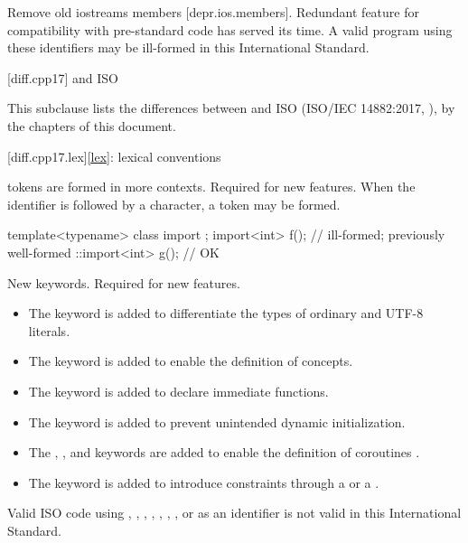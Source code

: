 \nodiffref
\change
Remove old iostreams members [depr.ios.members].
\rationale
Redundant feature for compatibility with pre-standard code
has served its time.
\effect
A valid \CppXIV{} program using these identifiers
may be ill-formed in this International Standard.

[diff.cpp17]{\Cpp{} and ISO \CppXVII{}}

\pnum
{}%
This subclause lists the differences between \Cpp{} and
ISO \CppXVII{} (ISO/IEC 14882:2017, ),
by the chapters of this document.

[diff.cpp17.lex]{\ref{lex}: lexical conventions}

\change
{} tokens are formed in more contexts.
\rationale
Required for new features.
\effect
When the identifier 
is followed by a \tcode{<} character,
a  token may be formed.
\begin{example}
\begin{codeblock}
template<typename> class import {};
import<int> f();                // ill-formed; previously well-formed
::import<int> g();              // OK
\end{codeblock}
\end{example}

\change
New keywords.
\rationale
Required for new features.
\begin{itemize}
\item
The  keyword is added to differentiate
the types of ordinary and UTF-8 literals.
\item
The  keyword is
added to enable the definition of concepts.
\item
The  keyword is added to
declare immediate functions.
\item
The  keyword is added to
prevent unintended dynamic initialization.
\item
The , , and  keywords are added
to enable the definition of coroutines .
\item
The  keyword is added
to introduce constraints through a  or
a .
\end{itemize}
\effectafteritemize
Valid ISO \CppXVII{} code using
,
,
,
,
, , ,
or 
as an identifier is not valid in this International Standard.

